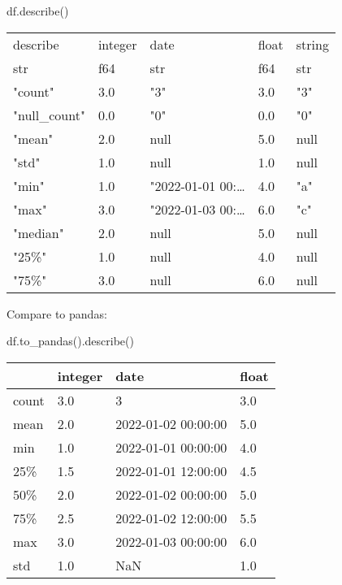 \documentclass[
  letterpaper,
  DIV=11,
  numbers=noendperiod]{scrartcl}
\newenvironment{Shaded}{\begin{snugshade}}{\end{snugshade}}
\newcommand{\NormalTok}[1]{\textcolor[rgb]{0.00,0.23,0.31}{#1}}
\begin{document}
\begin{Shaded}
\begin{Highlighting}[]
\NormalTok{df.describe()}
\end{Highlighting}
\end{Shaded}

\begin{longtable}[]{@{}lllll@{}}
\toprule()
describe & integer & date & float & string \\
str & f64 & str & f64 & str \\
\midrule()
\endhead
"count" & 3.0 & "3" & 3.0 & "3" \\
"null\_count" & 0.0 & "0" & 0.0 & "0" \\
"mean" & 2.0 & null & 5.0 & null \\
"std" & 1.0 & null & 1.0 & null \\
"min" & 1.0 & "2022-01-01 00:\ldots{} & 4.0 & "a" \\
"max" & 3.0 & "2022-01-03 00:\ldots{} & 6.0 & "c" \\
"median" & 2.0 & null & 5.0 & null \\
"25\%" & 1.0 & null & 4.0 & null \\
"75\%" & 3.0 & null & 6.0 & null \\
\bottomrule()
\end{longtable}

Compare to pandas:

\begin{Shaded}
\begin{Highlighting}[]
\NormalTok{df.to\_pandas().describe()}
\end{Highlighting}
\end{Shaded}

\begin{longtable}[]{@{}llll@{}}
\toprule()
& integer & date & float \\
\midrule()
\endhead
count & 3.0 & 3 & 3.0 \\
mean & 2.0 & 2022-01-02 00:00:00 & 5.0 \\
min & 1.0 & 2022-01-01 00:00:00 & 4.0 \\
25\% & 1.5 & 2022-01-01 12:00:00 & 4.5 \\
50\% & 2.0 & 2022-01-02 00:00:00 & 5.0 \\
75\% & 2.5 & 2022-01-02 12:00:00 & 5.5 \\
max & 3.0 & 2022-01-03 00:00:00 & 6.0 \\
std & 1.0 & NaN & 1.0 \\
\bottomrule()
\end{longtable}
\end{document}
